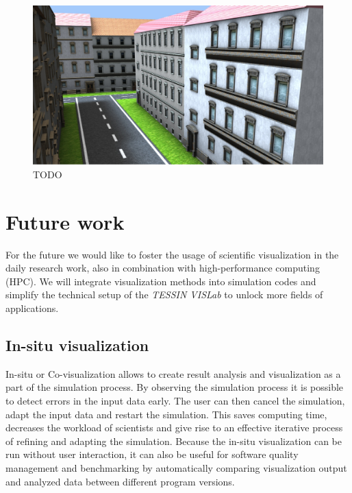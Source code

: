 \documentclass[twocolumn]{svjour3}          %
\begin{document}
\begin{figure}
  \includegraphics[width=\linewidth]{images/city.jpg}
\caption{TODO}
\label{fig:city}
\end{figure}

\section{Future work}
\label{future-work}

For the future we would like to foster the usage of scientific visualization in the daily research work, also in combination with high-performance computing (HPC). We will integrate visualization methods into simulation codes and simplify the technical setup of the \emph{TESSIN VISLab} to unlock more fields of applications.

\subsection{In-situ visualization}
\label{in-situ-visualization}

In-situ or Co-visualization allows to create result analysis and visualization as a part of the simulation process. By observing the simulation process it is possible to detect errors in the input data early. The user can then cancel the simulation, adapt the input data and restart the simulation. This saves computing time, decreases the workload of scientists and give rise to an effective iterative process of refining and adapting the simulation. Because the in-situ visualization can be run without user interaction, it can also be useful for software quality management and benchmarking by automatically comparing visualization output and analyzed data between different program versions.
\end{document}
